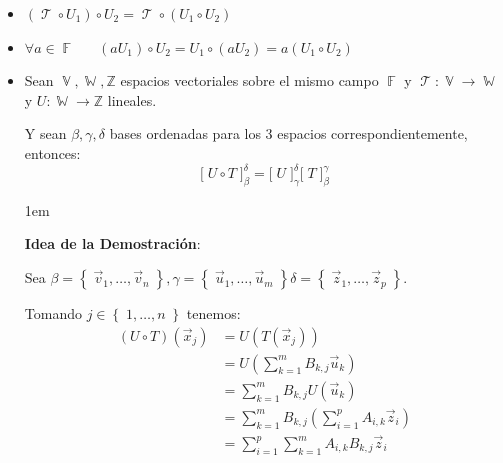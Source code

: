 \documentclass[12pt, fleqn]{report}                             %
\newenvironment{SmallIndentation}[1][0.75em]                    %
        {\begin{adjustwidth}{#1}{}\begin{footnotesize}}             %
        {\end{footnotesize}\end{adjustwidth}}                       %
\DeclareMathOperator \Space {\quad}                             %
\theoremstyle{break}                                            %
\DeclareMathOperator \GenericField {\mathbb{F}}                 %
\DeclareMathOperator \VectorSet    {\mathbb{V}}                 %
\DeclareMathOperator \SubVectorSet {\mathbb{W}}                 %
\DeclareMathOperator \LinTrans {\mathcal{T}}                    %
\newcommand{\Set}[1]    {\left\{ \; #1 \; \right\}}             %
\newcommand{\bigBrackets}[1] {\big[ \; #1 \; \big]}             %
\newcommand{\Wrap}[1]    {\left( #1 \right)}                    %
\begin{document}
\begin{itemize}
                    \item 
                        $(\LinTrans \circ U_1) \circ U_2 = \LinTrans \circ (U_1 \circ U_2)$


                    \item 
                        $\forall a \in \GenericField \Space (a U_1) \circ U_2 = U_1 \circ (aU_2) = a(U_1 \circ U_2)$

                    \clearpage

                    \item
                        Sean $\VectorSet, \SubVectorSet, \mathbb{Z}$ espacios vectoriales sobre el mismo campo
                        $\GenericField$ y $\LinTrans: \VectorSet \to \SubVectorSet$ y $U: \SubVectorSet \to \mathbb{Z}$
                        lineales.

                        Y sean $\beta, \gamma, \delta$ bases ordenadas para los 3 espacios correspondientemente, entonces:
                        \begin{equation*}
                            \bigBrackets{U \circ T}_\beta^\delta 
                                = \bigBrackets{U}_\gamma^\delta \bigBrackets{T}_\beta^\gamma
                        \end{equation*}

                        \begin{SmallIndentation}[1em]
                            \textbf{Idea de la Demostración}:
                            
                            Sea $\beta = \Set{\vec v_1, \dots, \vec v_n}, \gamma = \Set{\vec u_1, \dots, \vec u_m}
                            \delta = \Set{\vec z_1, \dots, \vec z_p}$.

                            Tomando $j \in \Set{1, \dots, n}$ tenemos:
                            \begin{align*}
                                (U \circ T)(\vec x_j)
                                    &= U \Wrap{T\Wrap{\vec x_j}}                                        \\ 
                                    &= U \Wrap{\sum_{k = 1}^m B_{k, j} \vec u_k}                        \\ 
                                    &= \sum_{k = 1}^m B_{k, j} U(\vec u_k)                              \\ 
                                    &= \sum_{k = 1}^m B_{k, j} \Wrap{\sum_{i=1}^p A_{i, k} \vec z_i}    \\ 
                                    &= \sum_{i=1}^p \sum_{k = 1}^m A_{i, k} B_{k, j}  \vec z_i
                            \end{align*}


\end{SmallIndentation}
\end{itemize}
\end{document}
